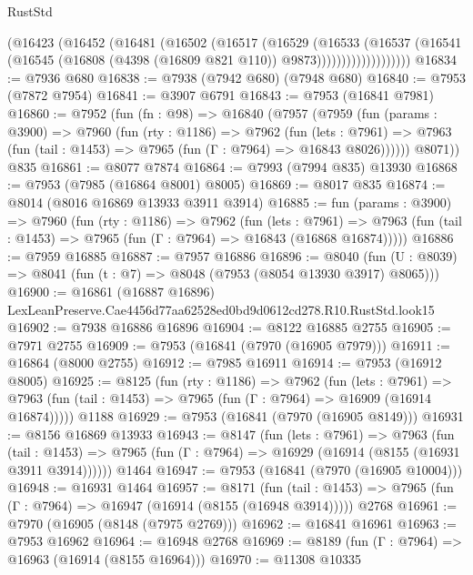 \begin{lexlean}{RustStd}
\begin{coremodule}
                    (@16423
                      (@16452
                        (@16481
                          (@16502
                            (@16517
                              (@16529
                                (@16533
                                  (@16537
                                    (@16541
                                      (@16545
                                        (@16808 (@4398 (@16809 @821 @110)) @9873)))))))))))))))))))
@16834 := @7936 @680
@16838 := @7938 (@7942 @680) (@7948 @680)
@16840 := @7953 (@7872 @7954)
@16841 := @3907 @6791
@16843 := @7953 (@16841 @7981)
@16860 := @7952
    (fun (fn : @98) =>
    @16840
      (@7957
        (@7959
          (fun (params : @3900) =>
          @7960
            (fun (rty : @1186) =>
            @7962
              (fun (lets : @7961) =>
              @7963 (fun (tail : @1453) => @7965 (fun (Γ : @7964) => @16843 @8026))))))
        @8071))
    @835
@16861 := @8077 @7874
@16864 := @7993 (@7994 @835) @13930
@16868 := @7953 (@7985 (@16864 @8001) @8005)
@16869 := @8017 @835
@16874 := @8014 (@8016 @16869 @13933 @3911 @3914)
@16885 := fun (params : @3900) =>
  @7960
    (fun (rty : @1186) =>
    @7962
      (fun (lets : @7961) =>
      @7963 (fun (tail : @1453) => @7965 (fun (Γ : @7964) => @16843 (@16868 @16874)))))
@16886 := @7959 @16885
@16887 := @7957 @16886
@16896 := @8040
    (fun (U : @8039) => @8041 (fun (t : @7) => @8048 (@7953 (@8054 @13930 @3917) @8065)))
@16900 := @16861
    (@16887 @16896)
    LexLeanPreserve.Cae4456d77aa62528ed0bd9d0612cd278.R10.RustStd.look15
@16902 := @7938 @16886 @16896
@16904 := @8122 @16885 @2755
@16905 := @7971 @2755
@16909 := @7953 (@16841 (@7970 (@16905 @7979)))
@16911 := @16864 (@8000 @2755)
@16912 := @7985 @16911
@16914 := @7953 (@16912 @8005)
@16925 := @8125
    (fun (rty : @1186) =>
    @7962
      (fun (lets : @7961) =>
      @7963 (fun (tail : @1453) => @7965 (fun (Γ : @7964) => @16909 (@16914 @16874)))))
    @1188
@16929 := @7953 (@16841 (@7970 (@16905 @8149)))
@16931 := @8156 @16869 @13933
@16943 := @8147
    (fun (lets : @7961) =>
    @7963
      (fun (tail : @1453) =>
      @7965 (fun (Γ : @7964) => @16929 (@16914 (@8155 (@16931 @3911 @3914))))))
    @1464
@16947 := @7953 (@16841 (@7970 (@16905 @10004)))
@16948 := @16931 @1464
@16957 := @8171
    (fun (tail : @1453) => @7965 (fun (Γ : @7964) => @16947 (@16914 (@8155 (@16948 @3914)))))
    @2768
@16961 := @7970 (@16905 (@8148 (@7975 @2769)))
@16962 := @16841 @16961
@16963 := @7953 @16962
@16964 := @16948 @2768
@16969 := @8189 (fun (Γ : @7964) => @16963 (@16914 (@8155 @16964)))
@16970 := @11308 @10335

\end{coremodule}
\end{lexlean}
